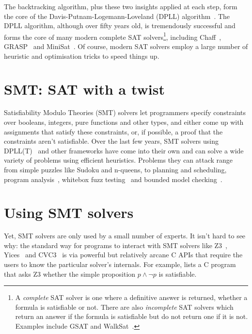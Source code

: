 The backtracking algorithm, plus these two insights applied at each step, form
the core of the Davis-Putnam-Logemann-Loveland (DPLL)
algorithm~\cite{dpll1,dpll2}. The DPLL algorithm, although over fifty years
old, is tremendously successful and forms the core of many modern complete SAT
solvers\footnote{A \textit{complete} SAT solver is one where a definitive
answer is returned, whether a formula is satisfiable or not. There are also
\textit{incomplete} SAT solvers which return an answer if the formula is
satisfiable but do not return one if it is not. Examples include GSAT and
WalkSat~\cite{walksat}.}, including Chaff~\cite{chaff}, GRASP~\cite{grasp} and
MiniSat~\cite{minisat}. Of course, modern SAT solvers employ a large number of
heuristic and optimisation tricks to speed things up.

\section{SMT: SAT with a twist}

Satisfiability Modulo Theories (SMT) solvers let programmers specify constraints
over booleans, integers, pure functions and other types, and either come up
with assignments that satisfy these constraints, or, if possible, a proof that
the constraints aren't satisfiable. Over the last few years, SMT solvers using
DPLL(T)~\cite{dpllt:04} and other frameworks have come into their own and can
solve a wide variety of problems using efficient heuristics. Problems they can
attack range from simple puzzles like Sudoku and n-queens, to planning and
scheduling, program analysis~\cite{Gulwani:08}, whitebox fuzz
testing~\cite{Godefroid:08} and bounded model checking~\cite{Armando:09}.

\section{Using SMT solvers}
\label{sec:usingsmt}

Yet, SMT solvers are only used by a small number of experts. It isn't hard to
see why: the standard way for programs to interact with SMT solvers like
Z3~\cite{z3}, Yices~\cite{yices} and CVC3~\cite{cvc3} is via powerful but
relatively arcane C APIs that require the users to know the particular
solver's internals. For example,  lists a C program that
asks Z3 whether the simple proposition $p \wedge \neg p$ is satisfiable.

